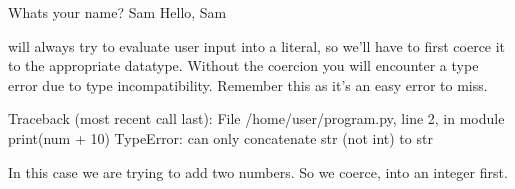 \documentclass[letterpaper,10pt,english]{jupyterBook}
\begin{document}
\begin{sphinxVerbatim}[commandchars=\\\{\}]
  

  
\end{sphinxVerbatim}

\begin{sphinxVerbatim}[commandchars=\\\{\}]
What\PYGZsq{}s your name?
Sam
Hello, Sam
\end{sphinxVerbatim}

\sphinxAtStartPar
{} will always try to evaluate user input into a  literal, so  we’ll have to first coerce it to the appropriate datatype. Without the coercion you will encounter a type error due to type incompatibility. Remember this as it’s an easy error to miss.

\begin{sphinxVerbatim}[commandchars=\\\{\}]
  
  
\end{sphinxVerbatim}

\begin{sphinxVerbatim}[commandchars=\\\{\}]
Traceback (most recent call last):
  File \PYGZdq{}/home/user/program.py\PYGZdq{}, line 2, in \PYGZlt{}module\PYGZgt{}
    print(num + 10)
          \PYGZti{}\PYGZti{}\PYGZti{}\PYGZti{}\PYGZca{}\PYGZti{}\PYGZti{}\PYGZti{}
TypeError: can only concatenate str (not \PYGZdq{}int\PYGZdq{}) to str
\end{sphinxVerbatim}

\sphinxAtStartPar
In this case we are trying to add two numbers. So we coerce,  into an integer first.

\begin{sphinxVerbatim}[commandchars=\\\{\}]
  
  
  
\end{sphinxVerbatim}
\end{document}
